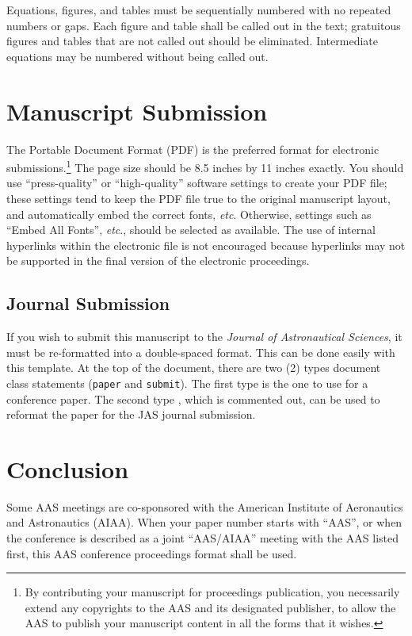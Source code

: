 \documentclass[letterpaper, preprint, paper,11pt]{AAS}	%
\begin{document}
Equations, figures, and tables must be sequentially numbered with no repeated numbers or gaps. Each figure and table shall be called out in the text; gratuitous figures and tables that are not called out should be eliminated. Intermediate equations may be numbered without being called out.




\section{Manuscript Submission}
The Portable Document Format (PDF) is the preferred format for electronic submissions.\footnote{By contributing your manuscript for proceedings publication, you necessarily extend any copyrights to the AAS and its designated publisher, to allow the AAS to publish your manuscript content in all the forms that it wishes.}
 The page size should be 8.5 inches by 11 inches exactly. You should use ``press-quality'' or ``high-quality'' software settings to create your PDF file; these settings tend to keep the PDF file true to the original manuscript layout, and automatically embed the correct fonts, \emph{etc}. Otherwise, settings such as ``Embed All Fonts'', \emph{etc}., should be selected as available. The use of internal hyperlinks within the electronic file is not encouraged because hyperlinks may not be supported in the final version of the electronic proceedings.

\subsection{Journal Submission}
If you wish to submit this manuscript to the \emph{Journal of Astronautical Sciences}, it must be re-formatted into a double-spaced format. This can be done easily with this template. At the top of the document, there are two (2) types document class statements ({\tt paper} and {\tt submit}).  The first type is the one to use for a conference paper.  The second type , which is commented out, can be used to reformat the paper for the JAS journal submission.


\section{Conclusion}
Some AAS meetings are co-sponsored with the American Institute of Aeronautics and Astronautics (AIAA). When your paper number starts with ``AAS'', or when the conference is described as a joint ``AAS/AIAA'' meeting with the AAS listed first, this AAS conference proceedings format shall be used.
\end{document}
